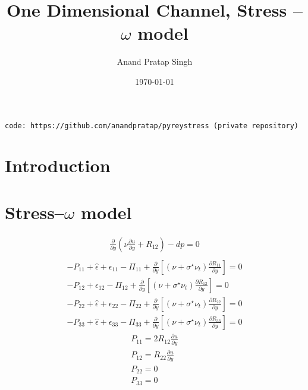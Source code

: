 \documentclass[%
notitlepage,
]{revtex4-1}
\newcommand{\pd}[2]{\frac{\partial #1}{\partial #2}}
\begin{document}
\preprint{}

\title[]{One Dimensional Channel,  Stress -- $\omega$ model }%

\author{Anand Pratap Singh}
%

\date{\today}%

\begin{abstract}

\end{abstract}

\maketitle
\tableofcontents
\vspace{1cm}
\texttt{code: https://github.com/anandpratap/pyreystress (private repository)}
\section{Introduction}
\appendix
\section{Stress--$\omega$ model}
\begin{eqnarray}
  \pd{}{y}\left(\nu \pd{u}{y} + R_{12}\right) - dp = 0\\
\end{eqnarray}
\begin{eqnarray}
  -P_{11} + \hat{\epsilon} + \epsilon_{11} - \Pi_{11} + \pd{}{y}\left[\left(\nu + \sigma^{\star} \nu_t\right)\pd{R_{11}}{y}\right] = 0\\ 
  -P_{12} + \epsilon_{12} - \Pi_{12} + \pd{}{y}\left[\left(\nu + \sigma^{\star} \nu_t\right)\pd{R_{12}}{y}\right] = 0 \\
 -P_{22} + \hat{\epsilon} + \epsilon_{22} - \Pi_{22} + \pd{}{y}\left[\left(\nu + \sigma^{\star} \nu_t\right)\pd{R_{22}}{y}\right] = 0\\
 -P_{33} + \hat{\epsilon} + \epsilon_{33} - \Pi_{33} + \pd{}{y}\left[\left(\nu + \sigma^{\star} \nu_t\right)\pd{R_{33}}{y}\right] = 0 
\end{eqnarray}
\begin{eqnarray}
  P_{11} = 2 R_{12}\pd{u}{y}\\ 
  P_{12} = R_{22}\pd{u}{y}\\ 
  P_{22} = 0\\
  P_{33} = 0
\end{eqnarray}
\end{document}
